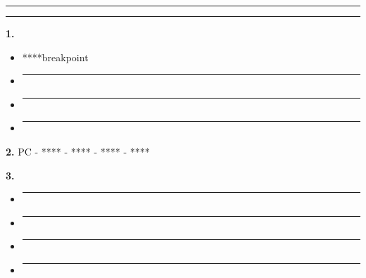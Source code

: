 \begin{center}\rule{0.5\linewidth}{0.5pt}\end{center}

\begin{center}\rule{0.5\linewidth}{0.5pt}\end{center}

\textbf{1. }

\begin{itemize}
\item
  ****breakpoint
\item
  \begin{center}\rule{0.5\linewidth}{0.5pt}\end{center}
\item
  \begin{center}\rule{0.5\linewidth}{0.5pt}\end{center}
\item
  \begin{center}\rule{0.5\linewidth}{0.5pt}\end{center}
\end{itemize}

\textbf{2. } PC - **** - **** - **** - ****

\textbf{3. }

\begin{itemize}
\item
  \begin{center}\rule{0.5\linewidth}{0.5pt}\end{center}
\item
  \begin{center}\rule{0.5\linewidth}{0.5pt}\end{center}
\item
  \begin{center}\rule{0.5\linewidth}{0.5pt}\end{center}
\item
  \begin{center}\rule{0.5\linewidth}{0.5pt}\end{center}
\end{itemize}

